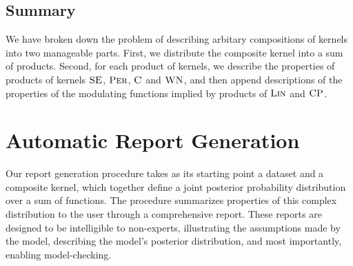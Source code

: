 \documentclass{article} %
\begin{document}
\subsection{Summary}  
\vspace{-0.08in}
We have broken down the problem of describing arbitary compositions of kernels into two manageable parts.  First, we distribute the composite kernel into a sum of products.  Second, for each product of kernels, we describe the properties of products of kernels ${\textsc{SE}}$, ${\textsc{Per}}$, ${\textsc{C}}$ and ${\textsc{WN}}$, and then append descriptions of the properties of the modulating functions implied by products of ${\textsc{Lin}}$ and ${\textsc{CP}}$.

\section{Automatic Report Generation}
\label{sec:method}
\vspace{-0.08in}

Our report generation procedure takes as its starting point a dataset and a composite kernel, which together define a joint posterior probability distribution over a sum of functions.
The procedure summarizes properties of this complex distribution to the user through a comprehensive report.
%
These reports are designed to be intelligible to non-experts, illustrating the assumptions made by the model, describing the model's posterior distribution, and most importantly, enabling model-checking.
%
%
%
%
%
\end{document}
